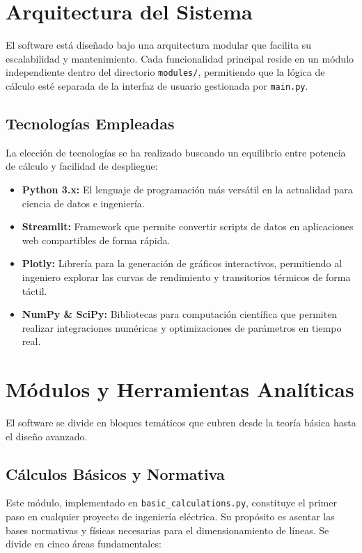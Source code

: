 \documentclass[11pt,a4paper]{article}
\begin{document}
\section{Arquitectura del Sistema}
El software está diseñado bajo una arquitectura modular que facilita su escalabilidad y mantenimiento. Cada funcionalidad principal reside en un módulo independiente dentro del directorio \texttt{modules/}, permitiendo que la lógica de cálculo esté separada de la interfaz de usuario gestionada por \texttt{main.py}.

\subsection{Tecnologías Empleadas}
La elección de tecnologías se ha realizado buscando un equilibrio entre potencia de cálculo y facilidad de despliegue:
\begin{itemize}
    \item \textbf{Python 3.x:} El lenguaje de programación más versátil en la actualidad para ciencia de datos e ingeniería.
    \item \textbf{Streamlit:} Framework que permite convertir scripts de datos en aplicaciones web compartibles de forma rápida.
    \item \textbf{Plotly:} Librería para la generación de gráficos interactivos, permitiendo al ingeniero explorar las curvas de rendimiento y transitorios térmicos de forma táctil.
    \item \textbf{NumPy \& SciPy:} Bibliotecas para computación científica que permiten realizar integraciones numéricas y optimizaciones de parámetros en tiempo real.
\end{itemize}

\section{Módulos y Herramientas Analíticas}
El software se divide en bloques temáticos que cubren desde la teoría básica hasta el diseño avanzado.

\subsection{Cálculos Básicos y Normativa}
Este módulo, implementado en \texttt{basic\_calculations.py}, constituye el primer paso en cualquier proyecto de ingeniería eléctrica. Su propósito es asentar las bases normativas y físicas necesarias para el dimensionamiento de líneas. Se divide en cinco áreas fundamentales:
\end{document}
